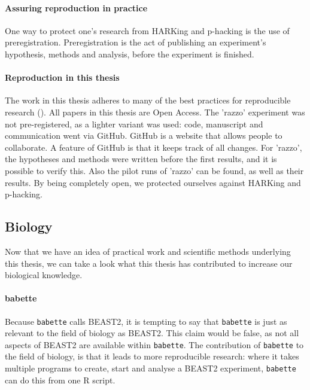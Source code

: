 \paragraph{Assuring reproduction in practice}

One way to protect one's research from HARKing and p-hacking
is the use of preregistration. Preregistration is the act of
publishing an experiment's hypothesis, methods and analysis,
before the experiment is finished. 

\paragraph{Reproduction in this thesis}

The work in this thesis adheres to many of the best 
practices for reproducible research (\cite{munafo2017manifesto}).
All papers in this thesis are Open Access.
The 'razzo' experiment was not pre-registered, as a lighter variant was used:
code, manuscript and communication went via GitHub. GitHub is a website that
allows people to collaborate. A feature of GitHub is that it keeps track
of all changes. For 'razzo', the hypotheses and methods were written
before the first results, and it is possible to verify this.
Also the pilot runs of 'razzo' can be found, as well as their results.
By being completely open, we protected ourselves against HARKing and
p-hacking.

\subsection{Biology}

Now that we have an idea of practical work and scientific methods underlying
this thesis, we can take a look what this thesis has contributed to
increase our biological knowledge. 

\paragraph{babette}

Because \verb;babette; calls BEAST2, it is tempting to say that \verb;babette;
is just as relevant to the field of biology as BEAST2. 
This claim would be false, as not all aspects of BEAST2 are available
within \verb;babette;. The contribution of \verb;babette; to the field of biology, 
is that it leads to more reproducible research: where it takes multiple
programs to create, start and analyse a BEAST2 experiment, \verb;babette;
can do this from one R script. 

